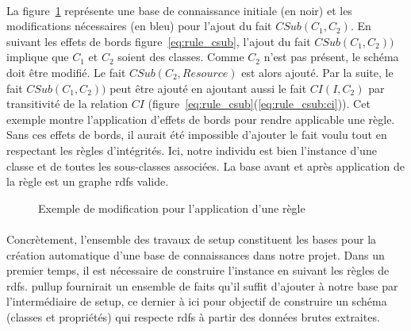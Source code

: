 \paragraph{}
La figure~\ref{fig:app_rule} représente une base de connaissance initiale (en noir) et les modifications nécessaires (en bleu) pour l'ajout du fait $CSub(C_1, C_2)$.
En suivant les effets de bords figure~\ref{eq:rule_csub}, l'ajout du fait $CSub(C_1, C_2))$ implique que $C_1$ et $C_2$ soient des classes.
Comme $C_2$ n'est pas présent, le schéma doit être modifié.
Le fait $CSub(C_2, Resource)$ est alors ajouté.
Par la suite, le fait $CSub(C_1, C_2))$ peut être ajouté en ajoutant aussi le fait $CI(I, C_2)$ par transitivité de la relation $CI$ (figure~\ref{eq:rule_csub}(\ref{eq:rule_csub:ci})).
Cet exemple montre l'application d'effets de bords pour rendre applicable une règle.
Sans ces effets de bords, il aurait été impossible d'ajouter le fait voulu tout en respectant les règles d'intégrités.
Ici, notre individu est bien l'instance d'une classe et de toutes les sous-classes associées.
La base avant et après application de la règle est un graphe \gls{rdfs} valide.

\begin{figure}[htb]
    \centering
    \caption{Exemple de modification pour l'application d'une règle}
    \label{fig:app_rule}
\end{figure}

\paragraph{}
Concrètement, l'ensemble des travaux de \gls{setup} constituent les bases pour la création automatique d'une base de connaissances dans notre projet.
Dans un premier temps, il est nécessaire de construire l'instance en suivant les règles de \gls{rdfs}.
\gls{pullup} fournirait un ensemble de faits qu'il suffit d'ajouter à notre base par l'intermédiaire de \gls{setup}, ce dernier à ici pour objectif de construire un schéma (classes et propriétés) qui respecte \gls{rdfs} à partir des données brutes extraites.

